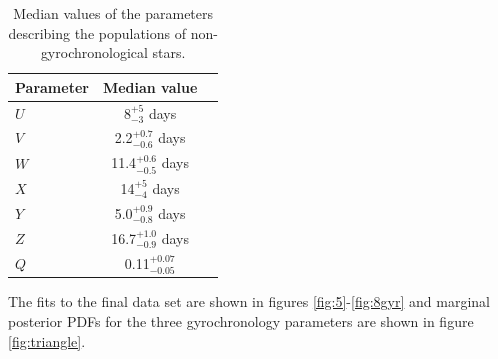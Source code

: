 \documentclass[useAMS, usenatbib]{mn2e}
\newcommand{\U}{8}  %
\newcommand{\V}{2.2}  %
\newcommand{\W}{11.4}  %
\newcommand{\X}{14} %
\newcommand{\Y}{5.0}  %
\newcommand{\Z}{16.7}  %
\newcommand{\Q}{0.11}
\newcommand{\Uerrp}{5}
\newcommand{\Uerrm}{3}
\newcommand{\Verrp}{0.7}
\newcommand{\Verrm}{0.6}
\newcommand{\Werrp}{0.6}
\newcommand{\Werrm}{0.5}
\newcommand{\Xerrp}{5}
\newcommand{\Xerrm}{4}
\newcommand{\Yerrp}{0.9}
\newcommand{\Yerrm}{0.8}
\newcommand{\Zerrp}{1.0}
\newcommand{\Zerrm}{0.9}
\newcommand{\Qerrp}{0.07}
\newcommand{\Qerrm}{0.05}
\begin{document}
\begin{table}
\caption{Median values of the parameters describing the populations of
	non-gyrochronological stars. \label{tab:nuisance}}

\begin{center}
\begin{tabular}{lcc}
\hline\hline
{Parameter} & {Median value} \\
\hline
$U$ & \U$^{+\Uerrp}_{-\Uerrm}$ days \\
$V$ & \V$^{+\Verrp}_{-\Verrm}$ days \\
$W$ & \W$^{+\Werrp}_{-\Werrm}$ days \\
$X$ & \X$^{+\Xerrp}_{-\Xerrm}$ days \\
$Y$ & \Y$^{+\Yerrp}_{-\Yerrm}$ days \\
$Z$ & \Z$^{+\Zerrp}_{-\Zerrm}$ days \\
$Q$ & \Q$^{+\Qerrp}_{-\Qerrm}$ \\
\hline
\end{tabular}
\end{center}
\end{table}

The fits to the final data set are shown in figures \ref{fig:5}-\ref{fig:8gyr}
and marginal posterior PDFs for the three gyrochronology parameters are shown
in figure \ref{fig:triangle}.
\end{document}
